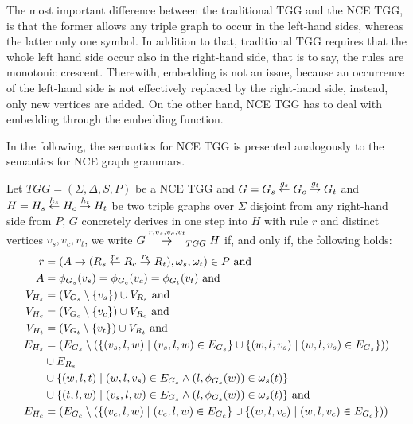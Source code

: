 \documentclass[]{report}
\begin{document}
The most important difference between the traditional TGG and the NCE TGG, is that the former allows any triple graph to occur in the left-hand sides, whereas the latter only one symbol. In addition to that, traditional TGG requires that the whole left hand side occur also in the right-hand side, that is to say, the rules are monotonic crescent. Therewith, embedding is not an issue, because an occurrence of the left-hand side is not effectively replaced by the right-hand side, instead, only new vertices are added. On the other hand, NCE TGG has to deal with embedding through the embedding function.

In the following, the semantics for NCE TGG is presented analogously to the semantics for NCE graph grammars.

\begin{definition}
	\label{def:tgg_dstep}
	Let $TGG = (\Sigma, \Delta, S, P)$ be a NCE TGG and $G = G_s \overset{g_s}{\leftarrow} G_c \overset{g_t}{\rightarrow} G_t$ and $H = H_s \overset{h_s}{\leftarrow} H_c \overset{h_t}{\rightarrow} H_t$ be two triple graphs over $\Sigma$ disjoint from any right-hand side from $P$, $G$ concretely derives in one step into $H$ with rule $r$ and distinct vertices $v_s, v_c, v_t$, we write $G \tcderiv{r}{v_s,v_c,v_t}{TGG} H$ if, and only if, the following holds:
	\begin{align*}
		r & = (A \pro (R_s \ms{r_s} R_c \mt{r_t} R_t), \omega_s, \omega_t) \in P \text{ and } \\
		A & = \phi_{G_s}(v_s) = \phi_{G_c}(v_c) = \phi_{G_t}(v_t) \text{ and}\\
		V_{H_s}  & = (V_{G_s} \setminus \{v_s\}) \cup V_{R_s} \text{ and}\\
		V_{H_c}  & = (V_{G_c} \setminus \{v_c\}) \cup V_{R_c} \text{ and}\\
		V_{H_t}  & = (V_{G_t} \setminus \{v_t\}) \cup V_{R_t} \text{ and}\\
		E_{H_s} & = (E_{G_s} \setminus (\{(v_s,l,w) \st (v_s,l,w) \in E_{G_s}\} \cup \{(w,l,v_s) \st (w,l,v_s) \in E_{G_s}\})) \\
		& \cup E_{R_s} \\
		& \cup \{(w,l,t) \st (w,l,v_s) \in E_{G_s} \land (l,\phi_{G_s}(w)) \in \omega_{s}(t)\} \\
		& \cup \{(t,l,w) \st (v_s,l,w) \in E_{G_s} \land (l,\phi_{G_s}(w)) \in \omega_{s}(t)\} \text{ and} \\
		E_{H_c} & = (E_{G_c} \setminus (\{(v_c,l,w) \st (v_c,l,w) \in E_{G_c}\} \cup \{(w,l,v_c) \st (w,l,v_c) \in E_{G_c}\})) \\

\end{align*}
\end{definition}
\end{document}
